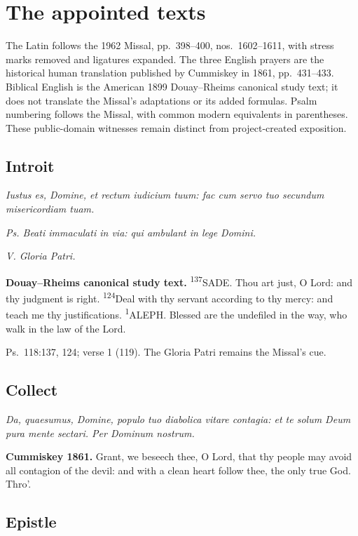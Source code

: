 \clearpage\section{The appointed texts}

The Latin follows the 1962 Missal, pp.~398--400, nos.~1602--1611, with stress marks removed and ligatures expanded. The three English prayers are the historical human translation published by Cummiskey in 1861, pp.~431--433. Biblical English is the American 1899 Douay--Rheims canonical study text; it does not translate the Missal’s adaptations or its added formulas. Psalm numbering follows the Missal, with common modern equivalents in parentheses. These public-domain witnesses remain distinct from project-created exposition.

\subsection{Introit}\label{proper-introit}

\textit{Iustus es, Domine, et rectum iudicium tuum: fac cum servo tuo secundum misericordiam tuam.}

\textit{Ps. Beati immaculati in via: qui ambulant in lege Domini.}

\textit{V. Gloria Patri.}

\textbf{Douay--Rheims canonical study text.} \textsuperscript{137}SADE. Thou art just, O Lord: and thy judgment is right. \textsuperscript{124}Deal with thy servant according to thy mercy: and teach me thy justifications. \textsuperscript{1}ALEPH. Blessed are the undefiled in the way, who walk in the law of the Lord.

Ps.~118:137, 124; verse 1 (119). The Gloria Patri remains the Missal’s cue.

\subsection{Collect}\label{proper-collect}

\textit{Da, quaesumus, Domine, populo tuo diabolica vitare contagia: et te solum Deum pura mente sectari. Per Dominum nostrum.}

\textbf{Cummiskey 1861.} Grant, we beseech thee, O Lord, that thy people may avoid all contagion of the devil: and with a clean heart follow thee, the only true God. Thro’.

\subsection{Epistle}\label{proper-epistle}

